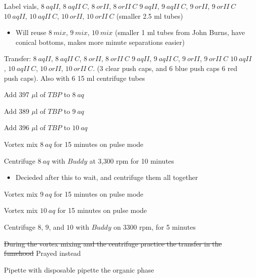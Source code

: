 \documentclass[idxtotoc,hyperref,openany,oneside]{labbook} %
\newcommand{\cmark}{\ding{51}}%
\newcommand{\done}{\rlap{$\square$}{\raisebox{2pt}{\large\hspace{1pt}\cmark}}%
  \hspace{-2.5pt}}
\begin{document}
\begin{todolist}
\item[\done]{Label vials,
  $\boxed{8\ aqII}$,  $\boxed{8\ aqII\ C}$,  $\boxed{8\ orII}$,
  $\boxed{8\ orII\ C}$
  $\boxed{9\ aqII}$,  $\boxed{9\ aqII\ C}$,  $\boxed{9\ orII}$,
  $\boxed{9\ orII\ C}$
  $\boxed{10\ aqII}$, $\boxed{10\ aqII\ C}$, $\boxed{10\ orII}$,
  $\boxed{10\ orII\ C}$ (smaller 2.5 ml tubes)}
  \begin{itemize}
  \item{Will reuse $\boxed{8\ mix}$, $\boxed{9\ mix}$,
    $\boxed{10\ mix}$ (smaller 1 ml tubes from John Burns,
    have conical bottoms, makes more minute separations easier)}
  \end{itemize}
  
\item[\done]{Transfer:
  $\boxed{8\ aqII}$,  $\boxed{8\ aqII\ C}$,  $\boxed{8\ orII}$,
  $\boxed{8\ orII\ C}$
  $\boxed{9\ aqII}$,  $\boxed{9\ aqII\ C}$,  $\boxed{9\ orII}$,
  $\boxed{9\ orII\ C}$
  $\boxed{10\ aqII}$, $\boxed{10\ aqII\ C}$, $\boxed{10\ orII}$,
  $\boxed{10\ orII\ C}$.
  (3 clear push caps, and 6 blue push caps
  6 red push caps). Also with 6 15 ml centrifuge tubes}
\item[\done]{Add 397 $\mu$l of $\boxed{TBP}$ to $\boxed{8\ aq}$}
\item[\done]{Add 389 $\mu$l of $\boxed{TBP}$ to $\boxed{9\ aq}$}
\item[\done]{Add 396 $\mu$l of $\boxed{TBP}$ to $\boxed{10\ aq}$}
\item[\done]{Vortex mix $\boxed{8\ aq}$ for 15 minutes on pulse mode}
\item[\done]{Centrifuge $\boxed{8\ aq}$ with $\boxed{Buddy}$ at 3,300
  rpm for 10 minutes}
  \begin{itemize}
  \item{Decieded after this to wait, and centrifuge them all together}
  \end{itemize}
\item[\done]{Vortex mix $\boxed{9\ aq}$ for 15 minutes on pulse mode}
\item[\done]{Vortex mix $\boxed{10\ aq}$ for 15 minutes on pulse mode}
\item[\done]{Centrifuge $\boxed{8}$, $\boxed{9}$, and $\boxed{10}$
  with $\boxed{Buddy}$ on 3300 rpm, for 5 minutes}
\item{\st{During the vortex mixing and the centrifuge
  practice the transfer in the fumehood} Prayed instead}
\item[\done]{Pipette with disposable pipette the organic phase
}
\end{todolist}
\end{document}
